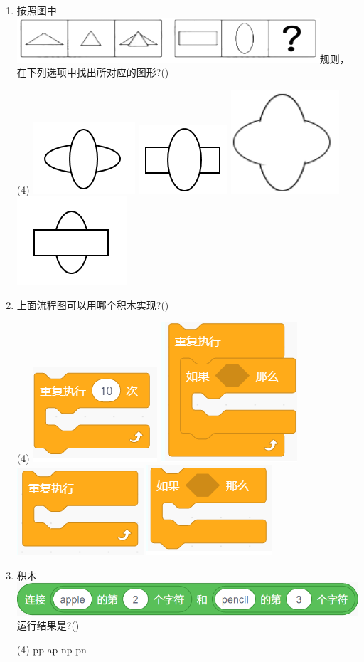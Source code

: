 \documentclass[10pt, a4paper]{article}
\begin{document}
\begin{enumerate}
        \item 按照图中\includegraphics[width=.3\textwidth]{4.png}规则，在下列选项中找出所对应的图形?(\qquad)
        \begin{tasks}(4)
            \task \includegraphics[width=.08\textwidth]{4a.png}
            \task \includegraphics[width=.08\textwidth]{4b.png}
            \task \includegraphics[width=.06\textwidth]{4c.png}
            \task \includegraphics[width=.08\textwidth]{4d.png}
        \end{tasks}

        \item 上面流程图可以用哪个积木实现?(\qquad)
        \begin{tasks}(4)
            \task \includegraphics[width=.12\textwidth]{5a.png}
            \task \includegraphics[width=.1\textwidth]{5b.png}
            \task \includegraphics[width=.12\textwidth]{5c.png}
            \task \includegraphics[width=.12\textwidth]{5d.png}
        \end{tasks}

        \item 积木\includegraphics[width=.35\textwidth]{6.png}运行结果是?(\qquad)
        \begin{tasks}(4)
            \task pp
            \task ap
            \task np
            \task pn
        \end{tasks}


\end{enumerate}
\end{document}
